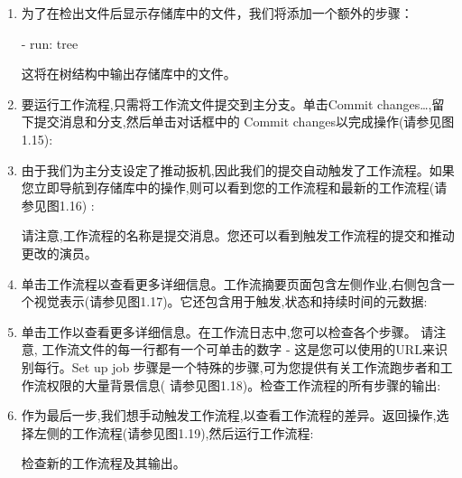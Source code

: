 \begin{enumerate}
\begin{myNotic}{使用github动作}
操作请参阅Github上的位置。语法为\{path\}@\{ref\}。路径指向GitHub上的物理位置, 如果操作位于存储库的根或\{owner\}/\{repo\}/\{path\}如果操作在子文件夹中,则可以是\{orsal\}/\{repo\}。 @\{ref\}之后的引用是指向提交的任何git引用。它可以是标签,分支或个人提交SHA。
\end{myNotic}

\item 
为了在检出文件后显示存储库中的文件，我们将添加一个额外的步骤：

\begin{shell}
- run: tree
\end{shell}

这将在树结构中输出存储库中的文件。

\item 
要运行工作流程,只需将工作流文件提交到主分支。单击Commit changes…,留下提交消息和分支,然后单击对话框中的 Commit changes以完成操作(请参见图1.15):


\item 
由于我们为主分支设定了推动扳机,因此我们的提交自动触发了工作流程。如果您立即导航到存储库中的操作,则可以看到您的工作流程和最新的工作流程(请参见图1.16) :


请注意,工作流程的名称是提交消息。您还可以看到触发工作流程的提交和推动更改的演员。

\item 
单击工作流程以查看更多详细信息。工作流摘要页面包含左侧作业,右侧包含一个视觉表示(请参见图1.17)。它还包含用于触发,状态和持续时间的元数据:


\item 
单击工作以查看更多详细信息。在工作流日志中,您可以检查各个步骤。 请注意, 工作流文件的每一行都有一个可单击的数字 - 这是您可以使用的URL来识别每行。Set up job 步骤是一个特殊的步骤,可为您提供有关工作流跑步者和工作流权限的大量背景信息( 请参见图1.18)。检查工作流程的所有步骤的输出:


\item 
作为最后一步,我们想手动触发工作流程,以查看工作流程的差异。返回操作,选择左侧的工作流程(请参见图1.19),然后运行工作流程:


检查新的工作流程及其输出。

\end{enumerate}

